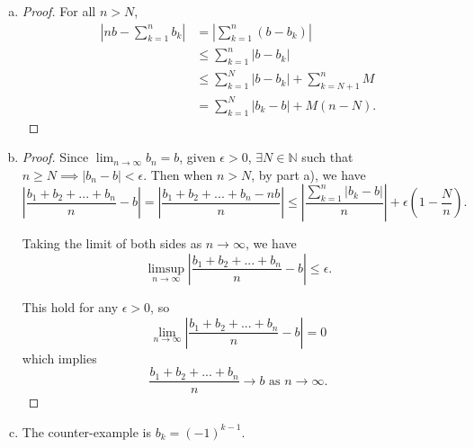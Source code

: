 \begin{Exercise}
\begin{enumerate}[a)]
\item
\begin{proof}
For all $n>N$,
\begin{align*}
\left|nb-\sum_{k=1}^{n}b_k\right| 
&= \left|\sum_{k=1}^{n}(b-b_k)\right| \\
&\leq  \sum_{k=1}^{n}|b-b_k| \\
&\leq \sum_{k=1}^{N} |b-b_k| + \sum_{k=N+1}^{n}M \\
&= \sum_{k=1}^{N}|b_k-b| + M(n-N).
\end{align*}
\end{proof}

\item
\begin{proof}
Since $\lim_{n\to\infty} b_n = b$, given $\epsilon>0$, $\exists N\in\mathbb{N}$ such that $n \geq N \implies |b_n-b| < \epsilon$.
Then when $n > N$, by part a), we have 
$$
\left|\frac{b_1+b_2+...+b_n}{n}-b\right| 
= \left|\frac{b_1+b_2+...+b_n-nb}{n}\right| 
\leq \left|\frac{\sum_{k=1}^{n}\left|b_k-b\right|}{n}\right|+\epsilon\left(1-\frac{N}{n}\right).
$$

Taking the limit of both sides as $n\to\infty$, we have 
$$
\limsup_{n\to\infty}\left|\frac{b_1+b_2+...+b_n}{n}-b\right| 
\leq \epsilon.
$$

This hold for any $\epsilon > 0$, so 
$$
\lim_{n\to\infty}\left|\frac{b_1+b_2+...+b_n}{n}-b\right| = 0 
$$
which implies 
$$
\frac{b_1+b_2+...+b_n}{n}\to b \text{ as } n\to\infty.
$$
\end{proof}

\item
\begin{solution}
The counter-example is $b_k=(-1)^{k-1}$.
\end{solution}
\end{enumerate}
\end{Exercise}